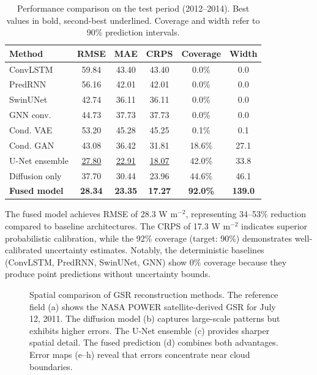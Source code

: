 \documentclass[preprint,12pt]{elsarticle}
\begin{document}
\begin{table}[htbp]
\centering
\caption{Performance comparison on the test period (2012--2014). Best values in bold, second-best underlined. Coverage and width refer to 90\% prediction intervals.}
\label{tab:main_results}
\begin{tabular}{lccccc}
\toprule
Method & RMSE & MAE & CRPS & Coverage & Width \\
\midrule
ConvLSTM & 59.84 & 43.40 & 43.40 & 0.0\% & 0.0 \\
PredRNN & 56.16 & 42.01 & 42.01 & 0.0\% & 0.0 \\
SwinUNet & 42.74 & 36.11 & 36.11 & 0.0\% & 0.0 \\
GNN conv. & 44.73 & 37.73 & 37.73 & 0.0\% & 0.0 \\
Cond. VAE & 53.20 & 45.28 & 45.25 & 0.1\% & 0.1 \\
Cond. GAN & 43.08 & 36.42 & 31.81 & 18.6\% & 27.1 \\
\midrule
U-Net ensemble & \underline{27.80} & \underline{22.91} & \underline{18.07} & 42.0\% & 33.8 \\
Diffusion only & 37.70 & 30.44 & 23.96 & 44.6\% & 46.1 \\
\textbf{Fused model} & \textbf{28.34} & \textbf{23.35} & \textbf{17.27} & \textbf{92.0\%} & \textbf{139.0} \\
\bottomrule
\end{tabular}
\end{table}

The fused model achieves RMSE of 28.3 W m$^{-2}$, representing 34--53\% reduction compared to baseline architectures. The CRPS of 17.3 W m$^{-2}$ indicates superior probabilistic calibration, while the 92\% coverage (target: 90\%) demonstrates well-calibrated uncertainty estimates. Notably, the deterministic baselines (ConvLSTM, PredRNN, SwinUNet, GNN) show 0\% coverage because they produce point predictions without uncertainty bounds.

\begin{figure}[htbp]
\centering
{}
\caption{Spatial comparison of GSR reconstruction methods. The reference field (a) shows the NASA POWER satellite-derived GSR for July 12, 2011. The diffusion model (b) captures large-scale patterns but exhibits higher errors. The U-Net ensemble (c) provides sharper spatial detail. The fused prediction (d) combines both advantages. Error maps (e--h) reveal that errors concentrate near cloud boundaries.}
\label{fig:spatial_comparison}
\end{figure}
\end{document}
